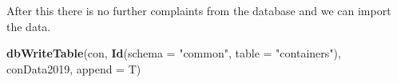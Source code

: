 \documentclass[]{article}
\newenvironment{Shaded}{\begin{snugshade}}{\end{snugshade}}
\newcommand{\DataTypeTok}[1]{\textcolor[rgb]{0.13,0.29,0.53}{#1}}
\newcommand{\KeywordTok}[1]{\textcolor[rgb]{0.13,0.29,0.53}{\textbf{#1}}}
\newcommand{\NormalTok}[1]{#1}
\newcommand{\StringTok}[1]{\textcolor[rgb]{0.31,0.60,0.02}{#1}}
\begin{document}
After this there is no further complaints from the database and we can
import the data.

\begin{Shaded}
\begin{Highlighting}[]
\KeywordTok{dbWriteTable}\NormalTok{(con,}
             \KeywordTok{Id}\NormalTok{(}\DataTypeTok{schema =} \StringTok{"common"}\NormalTok{, }\DataTypeTok{table =} \StringTok{"containers"}\NormalTok{),}
\NormalTok{             conData2019,}
             \DataTypeTok{append =}\NormalTok{ T)}
\end{Highlighting}
\end{Shaded}
\end{document}
